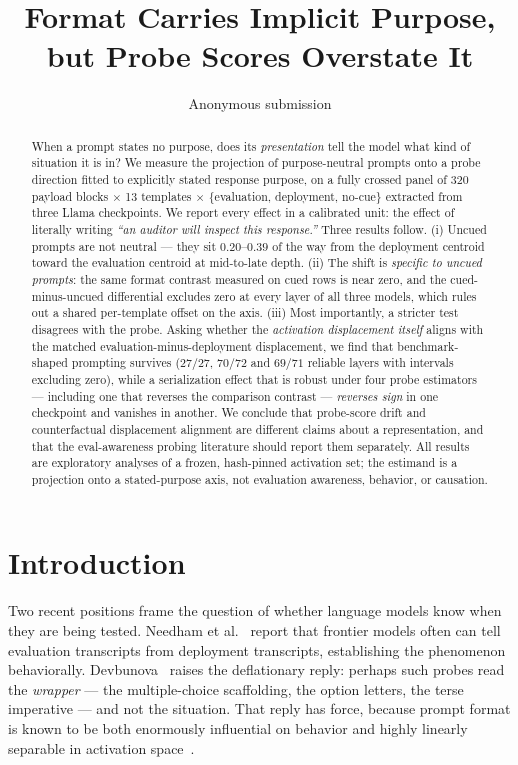 \documentclass[10pt]{article}
\title{\bfseries Format Carries Implicit Purpose,\\ but Probe Scores Overstate It}
\author{Anonymous submission}
\date{}
\begin{document}
\maketitle

\begin{abstract}
When a prompt states no purpose, does its \emph{presentation} tell the model
what kind of situation it is in? We measure the projection of purpose-neutral
prompts onto a probe direction fitted to explicitly stated response purpose, on
a fully crossed panel of 320 payload blocks $\times$ 13 templates $\times$
\{evaluation, deployment, no-cue\} extracted from three Llama checkpoints. We
report every effect in a calibrated unit: the effect of literally writing
\emph{``an auditor will inspect this response.''} Three results follow. (i)
Uncued prompts are not neutral --- they sit $0.20$--$0.39$ of the way from the
deployment centroid toward the evaluation centroid at mid-to-late depth. (ii)
The shift is \emph{specific to uncued prompts}: the same format contrast
measured on cued rows is near zero, and the cued-minus-uncued differential
excludes zero at every layer of all three models, which rules out a shared
per-template offset on the axis. (iii) Most importantly, a stricter test
disagrees with the probe. Asking whether the \emph{activation displacement
itself} aligns with the matched evaluation-minus-deployment displacement, we
find that benchmark-shaped prompting survives ($27/27$, $70/72$ and $69/71$
reliable layers with intervals excluding zero), while a serialization effect
that is robust under four probe estimators --- including one that reverses the
comparison contrast --- \emph{reverses sign} in one checkpoint and vanishes in
another. We conclude that probe-score drift and counterfactual displacement
alignment are different claims about a representation, and that the
eval-aware\-ness probing literature should report them separately. All results
are exploratory analyses of a frozen, hash-pinned activation set; the estimand
is a projection onto a stated-purpose axis, not evaluation awareness, behavior,
or causation.
\end{abstract}

\section{Introduction}

Two recent positions frame the question of whether language models know when
they are being tested. Needham et al.~\cite{needham2025} report that frontier
models often can tell evaluation transcripts from deployment transcripts,
establishing the phenomenon behaviorally. Devbunova~\cite{devbunova2026} raises
the deflationary reply: perhaps such probes read the \emph{wrapper} --- the
multiple-choice scaffolding, the option letters, the terse imperative --- and
not the situation. That reply has force, because prompt format is known to be
both enormously influential on behavior and highly linearly separable in
activation space~\cite{sclar2024}.
\end{document}
